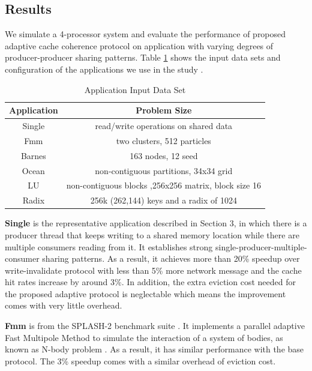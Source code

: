\documentclass[11pt,conference]{IEEEtran}
\begin{document}
\subsection{Results}
We simulate a 4-processor system and evaluate the performance of proposed adaptive cache coherence protocol on application with varying degrees of producer-producer sharing patterns. Table \ref{app} shows the input data sets and configuration of the applications we use in the study \cite{splash}.

\begin{table}[!h]
\renewcommand{\arraystretch}{2.5}
\caption{Application Input Data Set}
\label{app}
\centering
\begin{tabular}{|c|c|}
\hline
Application & Problem Size\\
\hline
Single & read/write operations on shared data\\
\hline
Fmm & two clusters, 512 particles\\
\hline
Barnes & 163 nodes, 12 seed\\
\hline
Ocean & non-contiguous partitions, 34x34 grid\\
\hline
LU & non-contiguous blocks ,256x256 matrix, block size 16\\
\hline
Radix & 256k (262,144) keys and a radix of 1024\\
\hline
\end{tabular}
\end{table}
\FloatBarrier

\textbf{Single} is the representative application described in Section 3, in which there is a producer thread that keeps writing to a shared memory location while there are multiple consumers reading from it. It establishes strong single-producer-multiple-consumer sharing patterns. As a result, it achieves more than 20\% speedup over write-invalidate protocol with less than 5\% more network message and the cache hit rates increase by around 3\%. In addition, the extra eviction cost needed for the proposed adaptive protocol is neglectable which means the improvement comes with very little overhead.

\textbf{Fmm} is from the SPLASH-2 benchmark suite \cite{splash}. It implements a parallel adaptive Fast Multipole Method
to simulate the interaction of a system of bodies, as known as N-body problem \cite{nbody}. As a result, it has similar performance with the base protocol. The 3\% speedup comes with a similar overhead of eviction cost.
\end{document}
